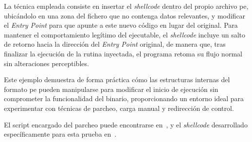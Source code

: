 La técnica empleada consiste en insertar el \textit{shellcode} dentro del propio archivo \acrshort{pe}, ubicándolo en una zona del fichero que no contenga datos relevantes, y modificar el \textit{Entry Point} para que apunte a este nuevo código en lugar del original. Para mantener el comportamiento legítimo del ejecutable, el \textit{shellcode} incluye un salto de retorno hacia la dirección del \textit{Entry Point} original, de manera que, tras finalizar la ejecución de la rutina inyectada, el programa retoma su flujo normal sin alteraciones perceptibles.

Este ejemplo demuestra de forma práctica cómo las estructuras internas del formato \acrshort{pe} pueden manipularse para modificar el inicio de ejecución sin comprometer la funcionalidad del binario, proporcionando un entorno ideal para experimentar con técnicas de parcheo, carga manual y redirección de control.

El script encargado del parcheo puede encontrarse en~\cite{binary_patching_entrypoint},
y el \textit{shellcode} desarrollado específicamente para esta prueba en~\cite{messagebox_patch_shellcode}.